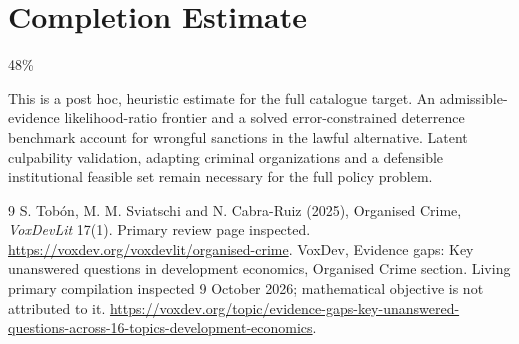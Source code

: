 \documentclass[11pt]{article}
\begin{document}
\section{Completion Estimate}
48\%

This is a post hoc, heuristic estimate for the full catalogue target.
An admissible-evidence likelihood-ratio frontier and a solved error-constrained deterrence benchmark account for wrongful sanctions in the lawful alternative. Latent culpability validation, adapting criminal organizations and a defensible institutional feasible set remain necessary for the full policy problem.

\begin{thebibliography}{9}
 S. Tob\'on, M. M. Sviatschi and N. Cabra-Ruiz (2025), Organised Crime, \emph{VoxDevLit} 17(1). Primary review page inspected. \url{https://voxdev.org/voxdevlit/organised-crime}.
 VoxDev, Evidence gaps: Key unanswered questions in development economics, Organised Crime section. Living primary compilation inspected 9 October 2026; mathematical objective is not attributed to it. \url{https://voxdev.org/topic/evidence-gaps-key-unanswered-questions-across-16-topics-development-economics}.
\end{thebibliography}
\end{document}
